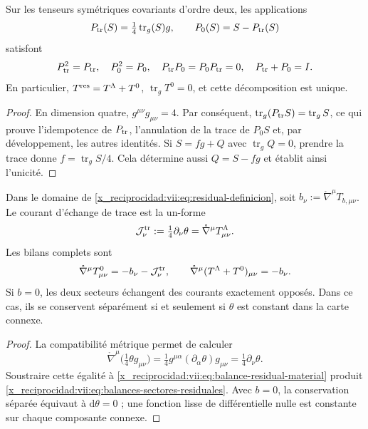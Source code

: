 \begin{proposition}
\label{x_reciprocidad:vii:prop:proyectores-traza-residual}
Sur les tenseurs symétriques covariants d'ordre deux, les applications
\[
 P_{\rm tr}(S)=\tfrac14\operatorname{tr}_g(S)g,
 \qquad P_0(S)=S-P_{\rm tr}(S)
\]
satisfont
\begin{equation}
 P_{\rm tr}^2=P_{\rm tr},\quad P_0^2=P_0,\quad
 P_{\rm tr}P_0=P_0P_{\rm tr}=0,\quad P_{\rm tr}+P_0=I.
 \label{x_reciprocidad:vii:eq:proyectores-traza-residual}
\end{equation}
En particulier, \(T^{\rm res}=T^\Lambda+T^0\), \(\operatorname{tr}_gT^0=0\), et cette décomposition est unique.
\end{proposition}
\begin{proof}
En dimension quatre, \(g^{\mu\nu}g_{\mu\nu}=4\). Par conséquent,
\(\operatorname{tr}_g(P_{\rm tr}S)=\operatorname{tr}_gS\), ce qui
prouve l'idempotence de \(P_{\rm tr}\), l'annulation de la trace
de \(P_0S\) et, par développement, les autres identités.
Si \(S=fg+Q\) avec \(\operatorname{tr}_gQ=0\), prendre la trace
donne \(f=\operatorname{tr}_gS/4\). Cela détermine aussi
\(Q=S-fg\) et établit ainsi l'unicité.
\end{proof}

\begin{theorem}
\label{x_reciprocidad:vii:thm:intercambio-traza-residual}
Dans le domaine de \eqref{x_reciprocidad:vii:eq:residual-definicion}, soit
\(b_\nu:=\mathring\nabla^\mu T_{b,\mu\nu}\). Le courant
d'échange de trace est la un-forme
\begin{equation}
 \mathcal J^{\rm tr}_\nu
 :=\tfrac14\partial_\nu\theta
 =\mathring\nabla^\mu T^\Lambda_{\mu\nu}.
 \label{x_reciprocidad:vii:eq:corriente-intercambio-traza}
\end{equation}
Les bilans complets sont
\begin{equation}
 \mathring\nabla^\mu T^0_{\mu\nu}
       =-b_\nu-\mathcal J^{\rm tr}_\nu,
 \qquad
 \mathring\nabla^\mu(T^\Lambda+T^0)_{\mu\nu}=-b_\nu.
 \label{x_reciprocidad:vii:eq:balances-sectores-residuales}
\end{equation}
Si \(b=0\), les deux secteurs échangent des courants exactement opposés. Dans ce cas, ils se conservent séparément si et seulement si \(\theta\) est constant dans la carte connexe.
\end{theorem}
\begin{proof}
La compatibilité métrique permet de calculer
\[
 \mathring\nabla^\mu\bigl(\tfrac14\theta g_{\mu\nu}\bigr)
 =\tfrac14g^{\mu\alpha}(\partial_\alpha\theta)g_{\mu\nu}
 =\tfrac14\partial_\nu\theta.
\]
Soustraire cette égalité à \eqref{x_reciprocidad:vii:eq:balance-residual-material} produit
\eqref{x_reciprocidad:vii:eq:balances-sectores-residuales}. Avec \(b=0\), la
conservation séparée équivaut à \(\mathrm d\theta=0\) ; une fonction
lisse de différentielle nulle est constante sur chaque composante connexe.
\end{proof}

